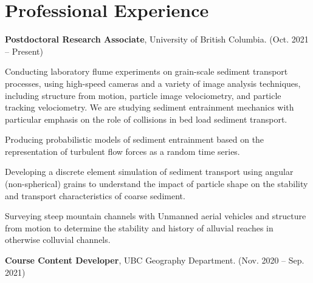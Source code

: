 \documentclass[11pt,letterpaper]{article}
\renewenvironment{itemize}{
	\begin{list}{}{
			\setlength{\leftmargin}{1.5em}
			\setlength{\rightmargin}{0em}  %
			\setlength{\itemsep}{0.25em}
			\setlength{\parskip}{0pt}
			\setlength{\parsep}{0.25em}
		}
	}{
	\end{list}
}
\newenvironment{itemizeit}
{\itemize\let\origitem\item
	\renewcommand{\item}[1][default]
	{\origitem[\tiny $\blacksquare$]}}
{\enditemize}
\renewenvironment{itemize}{
	\begin{list}{}{
			\setlength{\leftmargin}{1.5em}
			\setlength{\itemsep}{0.25em}
			\setlength{\parskip}{0pt}
			\setlength{\parsep}{0.25em}
		}
	}{
	\end{list}
}
\begin{document}
\section*{Professional Experience}
\begin{itemize}

\item {\bf Postdoctoral Research Associate}, University of British Columbia. \hfill (Oct. 2021 -- Present)

\begin{itemizeit} 
	\item Conducting laboratory flume experiments on grain-scale sediment transport processes, using high-speed cameras and a variety of image analysis techniques, including structure from motion, particle image velociometry, and particle tracking velociometry. We are studying sediment entrainment mechanics with particular emphasis on the role of collisions in bed load sediment transport.
    \item Producing probabilistic models of sediment entrainment based on the representation of turbulent flow forces as a random time series.
	\item Developing a discrete element simulation of sediment transport using angular (non-spherical) grains to understand the impact of particle shape on the stability and transport characteristics of coarse sediment.
	\item Surveying steep mountain channels with Unmanned aerial vehicles and structure from motion to determine the stability and history of alluvial reaches in otherwise colluvial channels.

\end{itemizeit}

\item {\bf Course Content Developer}, UBC Geography Department. \hfill (Nov. 2020 -- Sep. 2021)


\end{itemize}
\end{document}
